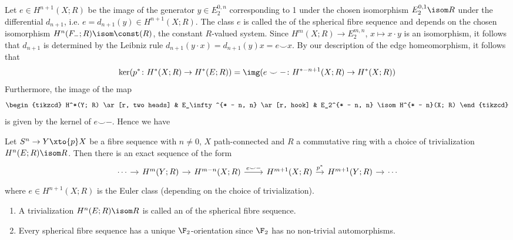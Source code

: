 Let $e \in H^{n + 1}(X; R)$ be the image of the generator $y \in E_2^{0, n}$ corresponding to 1 under the chosen isomorphism $E_2^{0, 1} \isom R$ under the differential $d_{n + 1}$, i.e. $e = d_{n + 1}(y) \in H^{n + 1}(X; R)$.
The class $e$ is called the  of the spherical fibre sequence and depends on the chosen isomorphism $H^n(F_{-}; R) \isom \const(R)$, the constant $R$-valued system.
Since $H^m(X; R) \to E_2^{m, n}$, $x \mapsto x \cdot y$ is an isomorphism, it follows that $d_{n + 1}$ is determined by the Leibniz rule $d_{n + 1}(y \cdot x) = d_{n + 1}(y) x = e \smile x$.
By our description of the edge homeomorphism, it follows that
\begin{equation*}
	\ker(p^*\colon H^*(X; R) \to H^*(E; R)) = \img(e \smile {{-}}\colon H^{* - n + 1}(X; R) \to H^*(X; R))
\end{equation*}
Furthermore, the image of the map
\begin{equation*}
	\begin{tikzcd}
		H^*(Y; R)
				\ar[r, two heads]
			& E_\infty^{* - n, n}
				\ar[r, hook]
			& E_2^{* - n, n} \isom H^{* - n}(X; R)
	\end{tikzcd}
\end{equation*}
is given by the kernel of $e \smile {{-}}$.
Hence we have
\begin{corollary}
	Let $S^n \to Y \xto{p} X$ be a fibre sequence with $n \neq 0$, $X$ path-connected and $R$ a commutative ring with a choice of trivialization $H^n(E; R) \isom R$.
	Then there is an exact sequence of the form
	\begin{equation*}
		\begin{tikzcd}[column sep = 1em]
			\cdots
					\ar[r]
				& H^m(Y; R)
					\ar[r]
				& H^{m - n}(X; R)
					\ar[r, "e \smile {{-}}"]
				&[1.28em] H^{m + 1}(X; R)
					\ar[r, "p^*"]
				& H^{m + 1}(Y; R)
					\ar[r]
				& \cdots
		\end{tikzcd}
	\end{equation*}
	where $e \in H^{n + 1}(X; R)$ is the Euler class (depending on the choice of trivialization).
\end{corollary}
\begin{remark}
	\leavevmode
	\begin{enumerate}
		\item A trivialization $H^n(E; R) \isom R$ is called an  of the spherical fibre sequence.
		\item Every spherical fibre sequence has a unique $\F_2$-orientation since $\F_2$ has no non-trivial automorphisms.
	\end{enumerate}
\end{remark}
